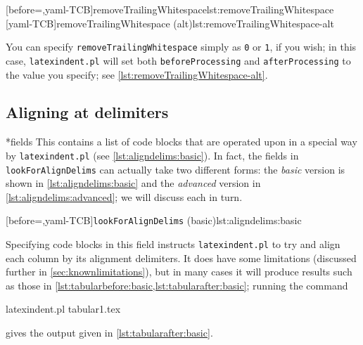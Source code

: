  \begin{cmhtcbraster}
  [before=\centering,yaml-TCB]{removeTrailingWhitespace}{lst:removeTrailingWhitespace}
  [yaml-TCB]{removeTrailingWhitespace (alt)}{lst:removeTrailingWhitespace-alt}
 \end{cmhtcbraster}

 You can specify \texttt{removeTrailingWhitespace} simply as \texttt{0} or \texttt{1}, if
 you wish; in this case, 
 \texttt{latexindent.pl} will set both \texttt{beforeProcessing} and
 \texttt{afterProcessing} to the value you specify; see
 \cref{lst:removeTrailingWhitespace-alt}.%

\subsection{Aligning at delimiters}\label{subsec:align-at-delimiters}
*{fields}
 This contains a list of code blocks that are operated upon in a special way by
 \texttt{latexindent.pl} (see \cref{lst:aligndelims:basic}). In fact, the fields in
 \texttt{lookForAlignDelims} can actually take two different forms: the \emph{basic}
 version is shown in \cref{lst:aligndelims:basic} and the \emph{advanced} version in
 \cref{lst:aligndelims:advanced}; we will discuss each in turn.

 [before=\centering,yaml-TCB]{\texttt{lookForAlignDelims} (basic)}{lst:aligndelims:basic}

 Specifying code blocks in this field instructs \texttt{latexindent.pl} to try and align
 each column by its alignment delimiters. It does have some limitations (discussed
 further in \cref{sec:knownlimitations}), but in many cases it will produce results such
 as those in \cref{lst:tabularbefore:basic,lst:tabularafter:basic}; running the command

 \begin{commandshell}
latexindent.pl tabular1.tex   
 \end{commandshell}

 gives the output given in \cref{lst:tabularafter:basic}.

 \begin{cmhtcbraster}
 \end{cmhtcbraster}

